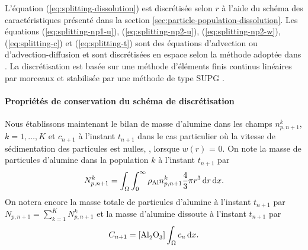 L'équation (\ref{eq:splitting-dissolution}) est discrétisée selon $r$ à
l'aide du schéma des caractéristiques présenté dans la section
\ref{sec:particle-population-dissolution}. Les équations
(\ref{eq:splitting-np1-u}), (\ref{eq:splitting-np2-u}),
(\ref{eq:splitting-np2-w}), (\ref{eq:splitting-c}) et
(\ref{eq:splitting-t}) sont des équations d'advection ou
d'advection-diffusion et sont discrétisées en espace selon la méthode
adoptée dans \cite{Hofer2011}. La discrétisation est basée sur une
méthode d'éléments finis continus linéaires par morceaux et stabilisée
par une méthode de type SUPG \cite{Quarteroni2008}.

\paragraph{Propriétés de conservation du schéma de discrétisation}
Nous établissons maintenant le bilan de masse d'alumine dans les
champs $n_{p,n+1}^k$, $k = 1,\dots, K$ et $c_{n+1}$ à l'instant
$t_{n+1}$ dans le cas particulier où la vitesse de sédimentation des
particules est nulles, \ie, lorsque $w(r)$ = 0. On note la masse
de particules d'alumine dans la population $k$ à l'instant $t_{n+1}$ par
\begin{equation}\label{eq:np-masse-def}
  N_{p,n+1}^k = \int_\Omega\int_0^\infty \rho_\mathrm{Al}
  n_{p,n+1}^k\frac{4}{3}\pi r^3\,\mathrm dr\,\mathrm dx.
\end{equation}
On notera encore la masse totale de particules d'alumine à l'instant
$t_{n+1}$ par $N_{p,n+1} =
\sum_{k = 1}^K N_{p,n+1}^k$ et la masse d'alumine dissoute à l'instant
$t_{n+1}$ par
\begin{equation}\label{eq:c-masse-def}
  C_{n+1} = [\cee{Al2O3}]\int_\Omega c_n\intd{x}.
\end{equation}

